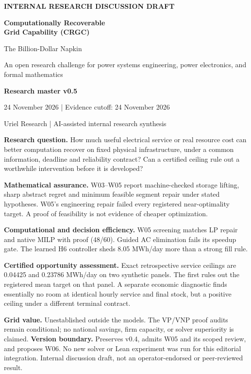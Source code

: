 \documentclass[11pt,letterpaper]{article}
\begin{document}
\hypersetup{pageanchor=false}\begin{titlepage}
{\small\bfseries INTERNAL RESEARCH DISCUSSION DRAFT\par}\vspace{1.2cm}
{\Huge\color{navy}\bfseries Computationally Recoverable\\[4pt] Grid Capability (CRGC)\par}\vspace{0.6cm}
{\LARGE The Billion-Dollar Napkin\par}\vspace{0.35cm}
{\large An open research challenge for power systems engineering, power electronics, and formal mathematics\par}\vspace{0.8cm}
{\Large\bfseries Research master v0.5\par}
24 November 2026 \quad | \quad Evidence cutoff: 24 November 2026\par
Uriel Research \quad | \quad AI-assisted internal research synthesis\par
\vspace{0.9cm}
\textbf{Research question.} How much useful electrical service or real resource cost can better computation recover on fixed physical infrastructure, under a common information, deadline and reliability contract? Can a certified ceiling rule out a worthwhile intervention before it is developed?

\textbf{Mathematical assurance.} W03--W05 report machine-checked storage lifting, sharp abstract regret and minimum feasible segment repair under stated hypotheses. W05's engineering repair failed every registered near-optimality target. A proof of feasibility is not evidence of cheaper optimization.

\textbf{Computational and decision efficiency.} W05 screening matches LP repair and native MILP with proof (48/60). Guided AC elimination fails its speedup gate. The learned H6 controller sheds 8.05 MWh/day more than a strong fill rule.

\textbf{Certified opportunity assessment.} Exact retrospective service ceilings are 0.04425 and 0.23786 MWh/day on two synthetic panels. The first rules out the registered mean target on that panel. A separate economic diagnostic finds essentially no room at identical hourly service and final stock, but a positive ceiling under a different terminal contract.

\textbf{Grid value.} Unestablished outside the models. The VP/VNP proof audits remain conditional; no national savings, firm capacity, or solver superiority is claimed.
\vfill
\textbf{Version boundary.} Preserves v0.4, admits W05 and its scoped review, and proposes W06. No new solver or Lean experiment was run for this editorial integration. Internal discussion draft, not an operator-endorsed or peer-reviewed result.
\end{titlepage}\hypersetup{pageanchor=true}
\end{document}

